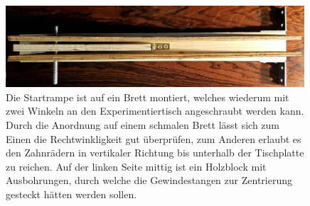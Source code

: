 \begin{figure}[htbp]
\vspace*{0.2cm}
\centering
 \includegraphics[width=0.99\textwidth]{images/rrampe1.jpg}
  \caption[Draufsicht der gebauten Rampe]{Die Startrampe ist auf ein Brett montiert, welches wiederum mit zwei Winkeln an den Experimentiertisch angeschraubt werden kann. Durch die Anordnung auf einem schmalen Brett lässt sich zum Einen die Rechtwinkligkeit gut überprüfen, zum Anderen erlaubt es den Zahnrädern in vertikaler Richtung bis unterhalb der Tischplatte zu reichen. Auf der linken Seite mittig ist ein Holzblock mit Ausbohrungen, durch welche die Gewindestangen zur Zentrierung gesteckt hätten werden sollen.}
  \label{fig:rampfenschliff2}
  \vspace{-0pt}
\end{figure}